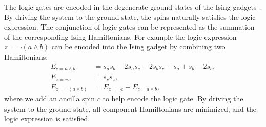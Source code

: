 \documentclass[twocolumn,superscriptaddress,english,showpacs,longbibliography]{revtex4-2}
\begin{document}
The logic gates are encoded in the degenerate ground states of the Ising gadgets~\cite{Aadit2022, onizawa2020design, camsari2017stochastic}.
By driving the system to the ground state, the spins naturally satisfies the logic expression.
The conjunction of logic gates can be represented as the summation of the corresponding Ising Hamiltonians.
For example the logic expression $z = \neg (a \land b)$ can be encoded into the Ising gadget by combining two Hamiltonians:
\begin{equation}
    \begin{split}
        E_{c = a \land b} &= s_a s_b -2 s_a s_c -2 s_bs_c + s_a + s_b -2 s_c,\\
        E_{z = \neg c} &= s_c s_z,\\
        E_{z = \neg (a \land b)} &= E_{z = \neg c} + E_{c = a \land b},
    \end{split}
\end{equation}
where we add an ancilla spin $c$ to help encode the logic gate.
By driving the system to the ground state, all component Hamiltonians are minimized, and the logic expression is satisfied.
\end{document}
